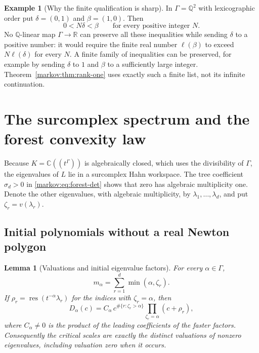\documentclass[11pt]{article}
\numberwithin{equation}{section}
\newtheorem{lemma}[theorem]{Lemma}
\theoremstyle{definition}
\newtheorem{example}[theorem]{Example}
\theoremstyle{remark}
\newcommand{\R}{\mathbb R}
\newcommand{\C}{\mathbb C}
\newcommand{\Q}{\mathbb Q}
\newcommand{\res}{\operatorname{res}}
\begin{document}
\begin{example}[Why the finite qualification is sharp]\label{markov:ex:rank-obstruction}
In $\Gamma=\Q^2$ with lexicographic order put
$\delta=(0,1)$ and $\beta=(1,0)$. Then
\[
 0<N\delta<\beta\qquad\text{for every positive integer }N.
\]
No $\Q$-linear map $\Gamma\to\R$ can preserve all these inequalities while sending
$\delta$ to a positive number: it would require the finite real number
$\ell(\beta)$ to exceed $N\ell(\delta)$ for every $N$. A finite family of
inequalities can be preserved, for example by sending $\delta$ to $1$ and
$\beta$ to a sufficiently large integer. Theorem~\ref{markov:thm:rank-one} uses exactly
such a finite list, not its infinite continuation.
\end{example}

\section{The surcomplex spectrum and the forest convexity law}\label{markov:sec:spectrum}

Because $K=\C((t^\Gamma))$ is algebraically closed, which uses the divisibility
of $\Gamma$, the eigenvalues of $L$ lie
in a surcomplex Hahn workspace. The tree coefficient $\sigma_d>0$ in
\eqref{markov:eq:forest-det} shows that zero has algebraic multiplicity one. Denote the
other eigenvalues, with algebraic multiplicity, by
$\lambda_1,\ldots,\lambda_d$, and put $\zeta_r=v(\lambda_r)$.

\subsection{Initial polynomials without a real Newton polygon}

\begin{lemma}[Valuations and initial eigenvalue factors]\label{markov:lem:initial-spectrum}
For every $\alpha\in\Gamma$,
\begin{equation}\label{markov:eq:sum-min}
 m_\alpha=\sum_{r=1}^d\min(\alpha,\zeta_r).
\end{equation}
If $\rho_r=\res(t^{-\alpha}\lambda_r)$ for the indices with
$\zeta_r=\alpha$, then
\begin{equation}\label{markov:eq:initial-factorization}
 D_\alpha(c)=C_\alpha\,
 c^{\#\{r:\zeta_r>\alpha\}}
 \prod_{\zeta_r=\alpha}(c+\rho_r),
\end{equation}
where $C_\alpha\ne0$ is the product of the leading coefficients of the faster
factors. Consequently the critical scales are exactly the distinct valuations of
nonzero eigenvalues, including valuation zero when it occurs.
\end{lemma}
\end{document}
